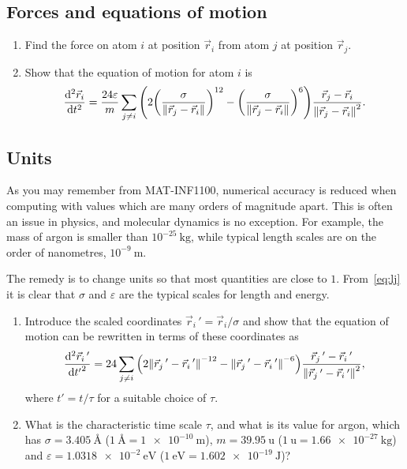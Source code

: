 \documentclass[11pt,british,a4paper]{report}
\begin{document}
\subsection{Forces and equations of motion}
\begin{enumerate}[label=\roman*.]
    \item Find the force on atom \(i\) at position \(\vec{r}_i\) from atom \(j\) at position \(\vec{r}_j\).
    \item Show that the equation of motion for atom \(i\) is
    \begin{equation}
        \dv[2]{\vec{r}_i}{t} = \frac{24\varepsilon}{m} \sum_{j \neq i} \qty(2\qty(\frac{\sigma}{\norm{\vec{r}_j-\vec{r}_i}})^{12}-\qty(\frac{\sigma}{\norm{\vec{r}_j-\vec{r}_i}})^6)\frac{\vec{r}_j-\vec{r}_i}{\norm{\vec{r}_j-\vec{r}_i}^2}.
    \end{equation}
\end{enumerate}

\subsection{Units}
As you may remember from MAT-INF1100, numerical accuracy is reduced when computing with values which are many orders of magnitude apart. This is often an issue in physics, and molecular dynamics is no exception. For example, the mass of argon is smaller than \(10^{-25}\ \si{\kg}\), while typical length scales are on the order of nanometres, \(10^{-9}\ \si{\m}\).

The remedy is to change units so that most quantities are close to \(1\). From~\vref{eq:lj} it is clear that \(\sigma\) and \(\varepsilon\) are the typical scales for length and energy.

\begin{enumerate}[label=\roman*.]
    \item Introduce the scaled coordinates \(\vec{r}_i\,'=\vec{r}_i/\sigma\) and show that the equation of motion can be rewritten in terms of these coordinates as
    \begin{equation}
        \dv[2]{\vec{r}_i\,'}{{t'}} = 24 \sum_{j \neq i} \qty(2\norm{\vec{r}_j\,'-\vec{r}_i\,'}^{-12}-\norm{\vec{r}_j\,'-\vec{r}_i\,'}^{-6})\frac{\vec{r}_j\,'-\vec{r}_i\,'}{\norm{\vec{r}_j\,'-\vec{r}_i\,'}^2},\label{eq:undim}
    \end{equation}
    where \(t'=t/\tau\) for a suitable choice of \(\tau\).
    \item What is the characteristic time scale \(\tau\), and what is its value for argon, which has \(\sigma=\SI{3.405}{\angstrom}\) (\(\SI{1}{\angstrom}=\SI{1e-10}{\m}\)), \(m = \SI{39.95}{\atomicmassunit}\) (\(\SI{1}{\atomicmassunit} = \SI{1.66e-27}{\kg}\)) and \(\varepsilon=\SI{1.0318e-2}{\eV}\) (\(\SI{1}{\eV}=\SI{1.602e-19}{\J}\))?
\end{enumerate}
\end{document}
